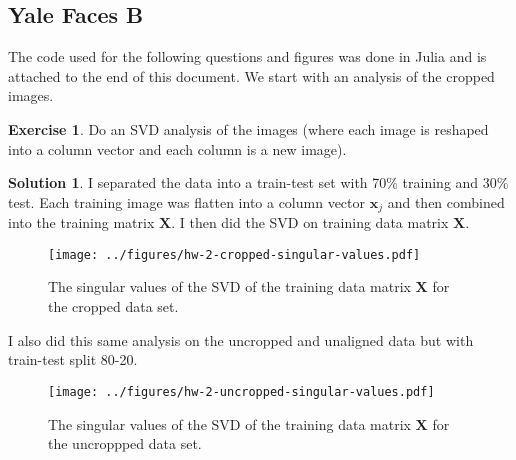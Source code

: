 \documentclass[12pt]{article}
\renewcommand{\vec}[1]{\mathbf{#1}}
\theoremstyle{definition}
\newtheorem{exer}{Exercise}
\newtheorem{sol}{Solution}
\theoremstyle{remark}
\begin{document}
\subsection*{Yale Faces B}%
\label{sub:yale_faces_b}

The code used for the following questions and figures was done in Julia and is attached to the end of this document. We start with an analysis of the cropped images.
\begin{exer}
Do an SVD analysis of the images (where each image is reshaped into a column vector and each column is a new image).
\end{exer}
\begin{sol}
    I separated the data into a train-test set with 70\% training and 30\% test. Each training image was flatten into a column vector $\vec{x}_j$ and then combined into the training matrix $\vec{X}$. I then did the SVD on training data matrix $\vec{X}$.
\begin{figure}[h]
    \centering
    \texttt{[image: ../figures/hw-2-cropped-singular-values.pdf]}
    \caption{The singular values of the SVD of the training data matrix $\vec{X}$ for the cropped data set.}%
    \label{fig:cropped_spectrum}
\end{figure}

I also did this same analysis on the uncropped and unaligned data but with train-test split 80-20.

\begin{figure}[h]
    \centering
    \texttt{[image: ../figures/hw-2-uncropped-singular-values.pdf]}
    \caption{The singular values of the SVD of the training data matrix $\vec{X}$ for the uncroppped data set.}%
    \label{fig:uncropped_spectrum}
\end{figure}

\end{sol}
\end{document}
